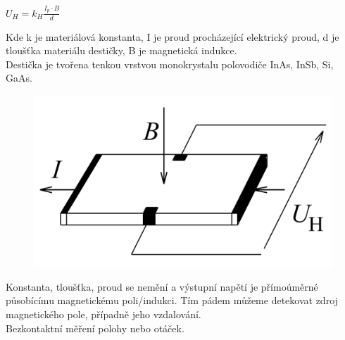 \begin{center}
    \(U_H = k_H \frac{I_p \cdot B}{d}\)
\end{center}
Kde k je materiálová konstanta, I je proud procházející elektrický proud, d je tloušťka materiálu destičky, B je magnetická indukce.\\
Destička je tvořena tenkou vrstvou monokrystalu polovodiče InAs, InSb, Si, GaAs. \\
\begin{figure}[h!]
    \centering
    \includegraphics[scale = 0.07]{img/HallSonda.png}
\end{figure}
Konstanta, tloušťka, proud se nemění a výstupní napětí je přímoúměrné působícímu magnetickému poli/indukci. Tím pádem můžeme detekovat zdroj magnetického pole, případně jeho vzdalování.\\
Bezkontaktní měření polohy nebo otáček.\\

